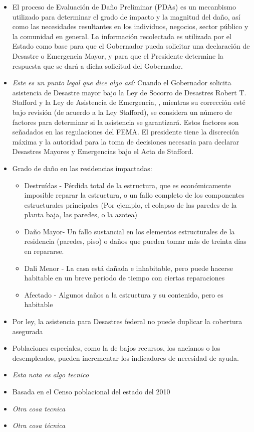 \documentclass[
10pt, %
spanish,
a4paper, %
twocolumn, %
landscape %
]{article}
\begin{document}
\begin{itemize}
\item El proceso de Evaluación de Daño Preliminar (PDAs) es un mecanbismo utilizado para determinar el grado de impacto y la magnitud del daño, así como las necesidades resultantes en los individuos, negocios, sector público y la comunidad en general. La información recolectada es utilizada por el Estado como base para que el Gobernador pueda solicitar una declaración de Desastre o Emergencia Mayor, y para que el Presidente determine la respuesta que se dará a dicha solicitud del Gobernador.\\
\item \textit{Este es un punto legal que dice algo así:} Cuando el Gobernador solicita asistencia de Desastre mayor bajo la Ley de Socorro de Desastres Robert T. Stafford y la Ley de Asistencia de Emergencia, , mientras su corrección esté bajo revisión (de acuerdo a la Ley Stafford), se considera un número de factores para determinar si la asistencia se garantizará. Estos factores son señadados en las regulaciones del FEMA. El presidente tiene la discreción máxima y la autoridad para la toma de decisiones necesaria para declarar Desastres Mayores y Emergencias bajo el Acta de Stafford.\\
\item Grado de daño en las residencias impactadas:\\
\begin{itemize}
\item Destruídas - Pérdida total de la estructura, que es económicamente imposible reparar la estructura, o un fallo completo de los componentes estructurales principales (Por ejemplo, el colapso de las paredes de la planta baja, las paredes, o la azotea)\\
\item Daño Mayor- Un fallo sustancial en los elementos estructurales de la residencia (paredes, piso) o daños que pueden tomar más de treinta días en repararse.\\
\item Dali Menor - La casa está dañada e inhabitable, pero puede hacerse habitable en un breve periodo de tiempo con ciertas reparaciones
\item Afectado - Algunos daños a la estructura y su contenido, pero es habitable\\
\end{itemize}
\item Por ley, la asistencia para Desastres federal no puede duplicar la cobertura asegurada\\
\item Poblaciones especiales, como la de bajos recursos, los ancianos o los desempleados, pueden incrementar los indicadores de necesidad de ayuda.\\
\item \textit{Esta nota es algo tecnico}
\item Basada en el Censo poblacional del estado del 2010\\
\item \textit{Otra cosa tecnica}
\item \textit{Otra cosa técnica}
\end{itemize}
\end{document}
